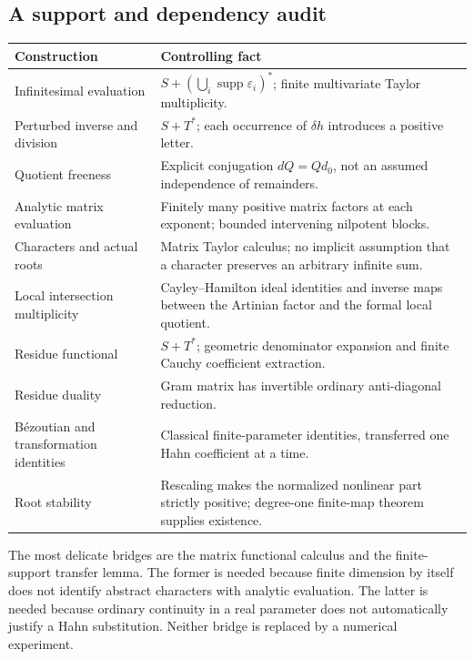 \documentclass[11pt,letterpaper]{article}
\theoremstyle{definition}
\theoremstyle{remark}
\newcommand{\supp}{\operatorname{supp}}
\numberwithin{equation}{section}
\begin{document}
\subsection{A support and dependency audit}
\begin{center}\small
\begin{longtable}{@{}L{0.30\textwidth}L{0.59\textwidth}@{}}
\toprule
Construction & Controlling fact\\
\midrule
\endhead
Infinitesimal evaluation & $S+(\bigcup_i\supp\varepsilon_i)^*$; finite multivariate Taylor multiplicity.\\[0.3em]
Perturbed inverse and division & $S+T^*$; each occurrence of $\delta h$ introduces a positive letter.\\[0.3em]
Quotient freeness & Explicit conjugation $dQ=Qd_0$, not an assumed independence of remainders.\\[0.3em]
Analytic matrix evaluation & Finitely many positive matrix factors at each exponent; bounded intervening nilpotent blocks.\\[0.3em]
Characters and actual roots & Matrix Taylor calculus; no implicit assumption that a character preserves an arbitrary infinite sum.\\[0.3em]
Local intersection multiplicity & Cayley--Hamilton ideal identities and inverse maps between the Artinian factor and the formal local quotient.\\[0.3em]
Residue functional & $S+T^*$; geometric denominator expansion and finite Cauchy coefficient extraction.\\[0.3em]
Residue duality & Gram matrix has invertible ordinary anti-diagonal reduction.\\[0.3em]
B\'ezoutian and transformation identities & Classical finite-parameter identities, transferred one Hahn coefficient at a time.\\[0.3em]
Root stability & Rescaling makes the normalized nonlinear part strictly positive; degree-one finite-map theorem supplies existence.\\
\bottomrule
\end{longtable}
\end{center}

The most delicate bridges are the matrix functional calculus and the finite-support transfer lemma. The former is needed because finite dimension by itself does not identify abstract characters with analytic evaluation. The latter is needed because ordinary continuity in a real parameter does not automatically justify a Hahn substitution. Neither bridge is replaced by a numerical experiment.
\end{document}
